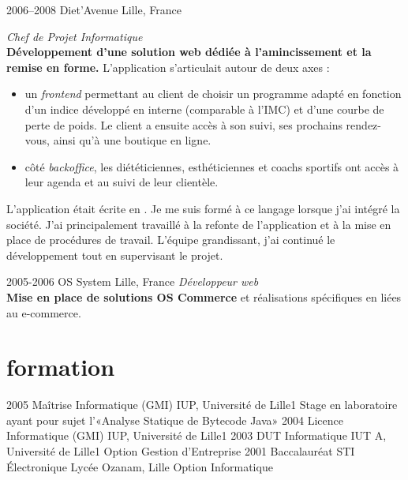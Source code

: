 \documentclass[]{cv} %
\begin{document}
\begin{entrylist}
{2006--2008}
{Diet'Avenue}
{Lille, France}
{\emph{Chef de Projet Informatique}
\vspace{5pt}\\
\textbf{Développement d'une solution web dédiée à l'amincissement et la remise en forme.} L'application s'articulait autour de deux axes :
\begin{itemize}
\item un \emph{frontend} permettant au client de choisir un programme adapté en fonction d'un indice développé en interne (comparable à l'IMC) et d'une courbe de perte de poids. Le client a ensuite accès à son suivi, ses prochains rendez-vous, ainsi qu'à une boutique en ligne.
\item côté \emph{backoffice}, les diététiciennes, esthéticiennes et coachs sportifs ont accès à leur agenda et au suivi de leur clientèle. 
\end{itemize}
\vspace{5pt}
L'application était écrite en . Je me suis formé à ce langage lorsque j'ai intégré la société. J'ai principalement travaillé à la refonte de l'application et à la mise en place de procédures de travail. L'équipe grandissant, j'ai continué le développement tout en supervisant le projet.
}
\entry
{2005-2006}
{OS System}
{Lille, France}
{\emph{Développeur web}
\vspace{5pt}\\
\textbf{Mise en place de solutions OS Commerce} et réalisations spécifiques en  liées au e-commerce.}
\end{entrylist}

\par\vspace{5\parskip}
\section{formation}

\begin{entrylist}
\entry
{2005}
{Maîtrise {\normalfont Informatique (GMI)}}
{IUP, Université de Lille1}
{Stage en laboratoire ayant pour sujet l'«Analyse Statique de Bytecode Java»}
\entry
{2004}
{Licence {\normalfont Informatique (GMI)}}
{IUP, Université de Lille1}
{}
\entry
{2003}
{DUT {\normalfont Informatique}}
{IUT A, Université de Lille1}
{Option Gestion d'Entreprise}
\entry
{2001}
{Baccalauréat {\normalfont STI Électronique}}
{Lycée Ozanam, Lille}
{Option Informatique}
\end{entrylist}
\end{document}
